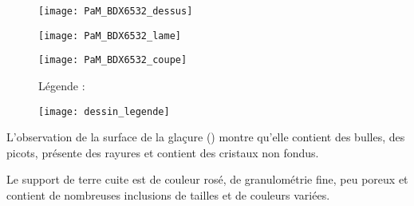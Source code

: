 \begin{figure}[htb]
  \begin{minipage}[t]{0.5\textwidth}
    \centerfloat
    \vspace*{0pt}
    \texttt{[image: PaM\_BDX6532\_dessus]}
  \end{minipage}%
  \quad%
  \begin{minipage}[t]{0.5\textwidth}
    \centerfloat
    \vspace*{0pt}
    \texttt{[image: PaM\_BDX6532\_lame]}
  \end{minipage}

  \bigskip

  \begin{minipage}[t]{0.5\textwidth}
    \centerfloat
    \vspace*{0pt}
    \texttt{[image: PaM\_BDX6532\_coupe]}
  \end{minipage}%
  \quad%
  \begin{minipage}[t]{0.5\textwidth}
    \vspace*{0pt}
    Légende :

    \texttt{[image: dessin\_legende]}
  \end{minipage}
  \caption{\legendeE}
  \label{dessin:6532}
\end{figure}

L'observation de la surface de la glaçure () montre 
qu'elle contient des bulles, des picots, présente des rayures et 
contient des cristaux non fondus.

Le support de terre cuite est de couleur rosé, de granulométrie 
fine, peu poreux et contient de nombreuses inclusions de tailles 
et de couleurs variées.

